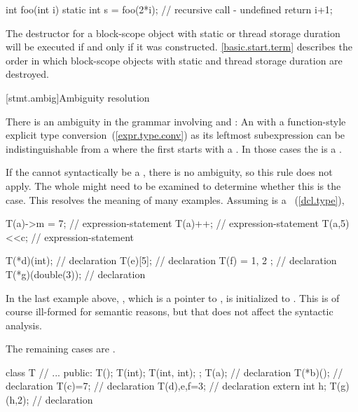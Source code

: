 \begin{codeblock}
int foo(int i) {
  static int s = foo(2*i);      // recursive call - undefined
  return i+1;
}
\end{codeblock}
\exitexample

\pnum
{}%
The destructor for a block-scope object with static or thread storage duration will be
executed if and only if it was constructed.
\enternote
\ref{basic.start.term} describes the order in which block-scope objects with
static and thread storage duration are destroyed.
\exitnote

[stmt.ambig]{Ambiguity resolution}%

\pnum
There is an ambiguity in the grammar involving
 and : An
 with a function-style explicit type
conversion~(\ref{expr.type.conv}) as its leftmost subexpression can be
indistinguishable from a  where the first
 starts with a \tcode{(}. In those cases the
 is a .

\pnum
\enternote
If the  cannot syntactically be a
, there is no ambiguity,
so this rule does not apply.
The whole  might need to be examined
to determine whether this is the case. This resolves the meaning
of many examples.
\enterexample
Assuming  is a
~(\ref{dcl.type}),

\begin{codeblock}
T(a)->m = 7;        // expression-statement
T(a)++;             // expression-statement
T(a,5)<<c;          // expression-statement

T(*d)(int);         //  declaration
T(e)[5];            //  declaration
T(f) = { 1, 2 };    //  declaration
T(*g)(double(3));   //  declaration
\end{codeblock}

In the last example above, , which is a pointer to ,
is initialized to . This is of course ill-formed for
semantic reasons, but that does not affect the syntactic analysis.
\exitexample

The remaining cases are .
\enterexample

\begin{codeblock}
class T {
  // ...
public:
  T();
  T(int);
  T(int, int);
};
T(a);               //  declaration
T(*b)();            //  declaration
T(c)=7;             //  declaration
T(d),e,f=3;         //  declaration
extern int h;
T(g)(h,2);          //  declaration
\end{codeblock}
\exitexample
\exitnote

